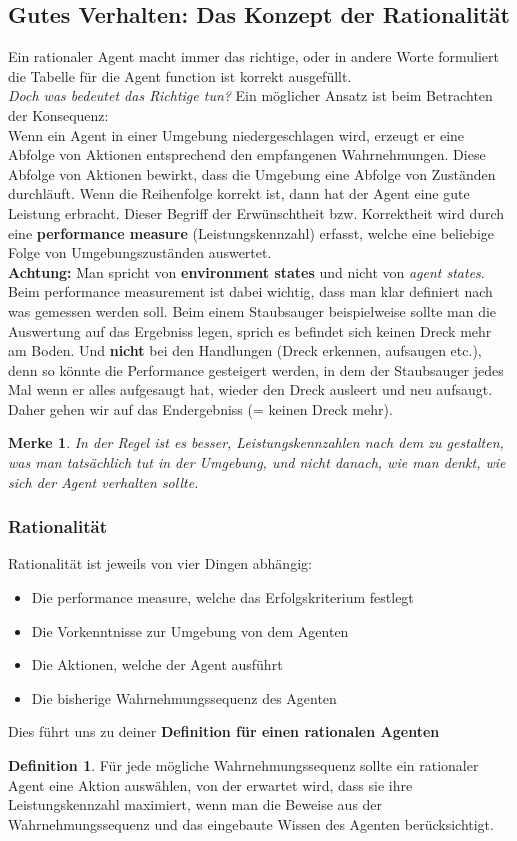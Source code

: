 \documentclass{article}
\theoremstyle{merke}
\newtheorem*{merke}{Merke}
\theoremstyle{definition}
\newtheorem{definition}{Definition}
\begin{document}
\subsection{Gutes Verhalten: Das Konzept der Rationalität}
Ein rationaler Agent macht immer das richtige, oder in andere Worte formuliert die Tabelle für die Agent function ist korrekt ausgefüllt.\\
\textit{Doch was bedeutet das Richtige tun?}
Ein möglicher Ansatz ist beim Betrachten der Konsequenz:\\
Wenn ein Agent in einer Umgebung niedergeschlagen wird, erzeugt er eine Abfolge von Aktionen entsprechend den empfangenen Wahrnehmungen. Diese Abfolge von Aktionen bewirkt, dass die Umgebung eine Abfolge von Zuständen durchläuft. Wenn die Reihenfolge korrekt ist, dann hat der Agent eine gute Leistung erbracht. Dieser Begriff der Erwünschtheit bzw. Korrektheit wird durch eine \textbf{performance measure} (Leistungskennzahl) erfasst, welche eine beliebige Folge von Umgebungszuständen auswertet.\\
\textbf{Achtung:} Man spricht von \textbf{environment states} und nicht von \textit{agent states}.\\
Beim performance measurement ist dabei wichtig, dass man klar definiert nach was gemessen werden soll. Beim einem Staubsauger beispielweise sollte man die Auswertung auf das Ergebniss legen, sprich es befindet sich keinen Dreck mehr am Boden. Und \textbf{nicht} bei den Handlungen (Dreck erkennen, aufsaugen etc.), denn so könnte die Performance gesteigert werden, in dem der Staubsauger jedes Mal wenn er alles aufgesaugt hat, wieder den Dreck ausleert und neu aufsaugt. Daher gehen wir auf das Endergebniss (= keinen Dreck mehr).\\

\begin{merke}
 In der Regel ist es besser, Leistungskennzahlen nach dem zu gestalten, was man tatsächlich tut in der Umgebung, und nicht danach, wie man denkt, wie sich der Agent verhalten sollte.
\end{merke}

\subsubsection{Rationalität}
Rationalität ist jeweils von vier Dingen abhängig:
\begin{itemize}
\item Die performance measure, welche das Erfolgskriterium festlegt
\item Die Vorkenntnisse zur Umgebung von dem Agenten
\item Die Aktionen, welche der Agent ausführt
\item Die bisherige Wahrnehmungssequenz des Agenten
\end{itemize}
Dies führt uns zu deiner \textbf{Definition für einen rationalen Agenten}
\begin{definition}
Für jede mögliche Wahrnehmungssequenz sollte ein rationaler Agent eine Aktion auswählen, von der erwartet wird, dass sie ihre Leistungskennzahl maximiert, wenn man die Beweise aus der Wahrnehmungssequenz und das eingebaute Wissen des Agenten berücksichtigt.
\end{definition}
\end{document}
